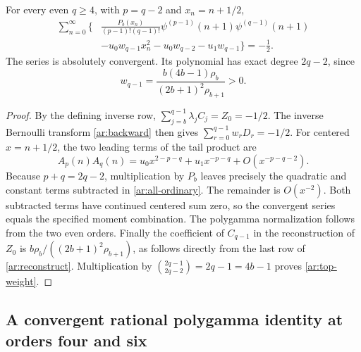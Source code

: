 \begin{corollary}
\label{ar:all-rational}
For every even $q\ge4$, with $p=q-2$ and $x_n=n+1/2$,
\begin{equation}\label{ar:all-ordinary}
 \begin{split}
 \sum_{n=0}^{\infty}\bigg\{
 &\frac{P_b(x_n)}{(p-1)!(q-1)!}
       \psi^{(p-1)}(n+1)\psi^{(q-1)}(n+1)\\
 &-u_0w_{q-1}x_n^2
      -u_0w_{q-2}-u_1w_{q-1}\bigg\}=-\frac12.
 \end{split}
\end{equation}
The series is absolutely convergent. Its polynomial has exact degree
$2q-2$, since
\begin{equation}\label{ar:top-weight}
       w_{q-1}
       =\frac{b(4b-1)\rho_b}{(2b+1)^2\rho_{b+1}}>0.
\end{equation}
\end{corollary}

\begin{proof}
By the defining inverse row, $\sum_{j=b}^{q-1}\lambda_jC_j=Z_0=-1/2$.
The inverse Bernoulli transform \eqref{ar:backward} then gives
$\sum_{r=0}^{q-1}w_rD_r=-1/2$.
For centered $x=n+1/2$, the two leading terms of the tail product are
\[
                 A_p(n)A_q(n)=u_0x^{2-p-q}+u_1x^{-p-q}
                                  +O(x^{-p-q-2}).
\]
Because $p+q=2q-2$, multiplication by $P_b$ leaves precisely the
quadratic and constant terms subtracted in \eqref{ar:all-ordinary}.
The remainder is $O(x^{-2})$. Both subtracted terms have continued
centered sum zero, so the convergent series equals the specified moment
combination. The polygamma normalization follows from the two even
orders. Finally the coefficient of $C_{q-1}$ in the reconstruction
of $Z_0$ is $b\rho_b/((2b+1)^2\rho_{b+1})$, as follows directly
from the last row of \eqref{ar:reconstruct}. Multiplication by
$\binom{2q-1}{2q-2}=2q-1=4b-1$ proves \eqref{ar:top-weight}.
\end{proof}

\subsection{A convergent rational polygamma identity at orders four and six}

